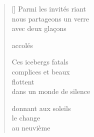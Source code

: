 \documentclass[11pt,a4paper]{article}
\begin{document}
\thispagestyle{empty}


\settowidth{\versewidth}{nous partageons un verre}

\bigskip

\begin{verse}[\versewidth]
  Parmi les invités riant \\
  nous partageons un verre \\
  avec deux glaçons

  accolés

  Ces icebergs fatals \\
  complices et beaux \\
  flottent \\
  dans un monde de silence

  donnant aux soleils \\
  le change \\
  au neuvième
\end{verse}
\end{document}
